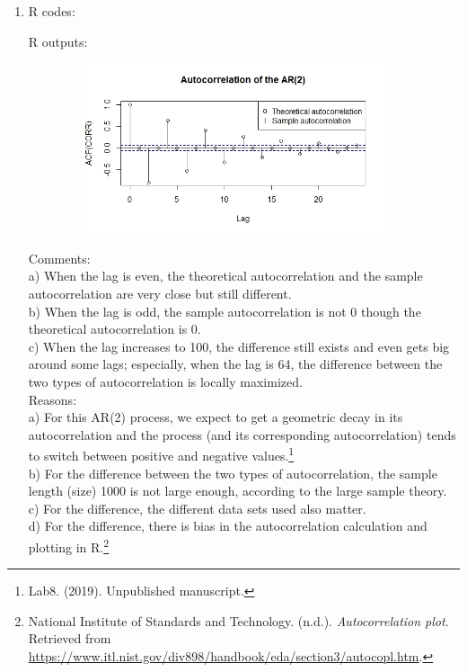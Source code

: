 \documentclass[10pt]{article}
\begin{document}
\begin{enumerate}[1)]
\item
R codes:

R outputs:
\begin{figure}[H]
  \centering
  \includegraphics[width=10cm,height=5cm]{p44a.jpeg}
\end{figure}
Comments:\\
a) When the lag is even, the theoretical autocorrelation and the sample autocorrelation are very close but still different.\\
b) When the lag is odd, the sample autocorrelation is not 0 though the theoretical autocorrelation is 0.\\
c) When the lag increases to 100, the difference still exists and even gets big around some lags; especially, when the lag is 64, the difference between the two types of autocorrelation is locally maximized.\\
Reasons:\\
a) For this AR(2) process, we expect to get a geometric decay in its autocorrelation and the process (and its corresponding autocorrelation) tends to switch between positive and negative values.\footnote{ Lab8. (2019). Unpublished manuscript.}\\
b) For the difference between the two types of autocorrelation, the sample length (size) 1000 is not large enough, according to the large sample theory.\\
c) For the difference, the different data sets used also matter.\\
d) For the difference, there is bias in the autocorrelation calculation and plotting in R.\footnote{ National Institute of Standards and Technology. (n.d.). \textit{Autocorrelation plot}. Retrieved from \url{https://www.itl.nist.gov/div898/handbook/eda/section3/autocopl.htm}.}

\end{enumerate}
\end{document}
